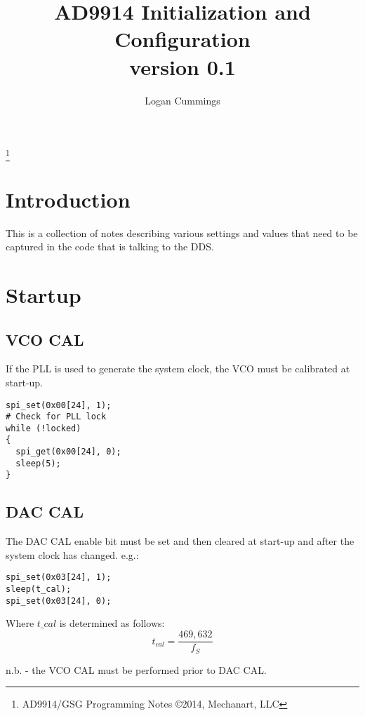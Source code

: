 \documentclass[letterpaper,12pt]{article}
\title{AD9914 Initialization and Configuration\\ \vspace{2 mm} {\large version 0.1}}
\author{Logan Cummings}
\begin{document}
\maketitle
\renewcommand*\footnoterule{}
\let\thefootnote\relax\footnote{AD9914/GSG \hfill Programming Notes  \hfill {\copyright{2014, Mechanart, LLC}}}
\newpage
\tableofcontents

\section{Introduction}
This is a collection of notes describing various settings and values that
need to be captured in the code that is talking to the DDS. 

\section{Startup}
\subsection{VCO CAL}
If the PLL is used to generate the system clock, the VCO must be calibrated at
start-up. 
\begin{verbatim}
spi_set(0x00[24], 1);
# Check for PLL lock
while (!locked)
{
  spi_get(0x00[24], 0);
  sleep(5);
}
\end{verbatim}


\subsection{DAC CAL}The DAC CAL enable bit must be set and then cleared at start-up and after
the system clock has changed. 
e.g.:
\begin{verbatim}
spi_set(0x03[24], 1);
sleep(t_cal);
spi_set(0x03[24], 0);
\end{verbatim}
Where $t\_cal$ is determined as follows:
\[ 
  t_{cal} = \frac{469,632}{f_S} 
\]

n.b. - the VCO CAL must be performed prior to DAC CAL. 
\end{document}
